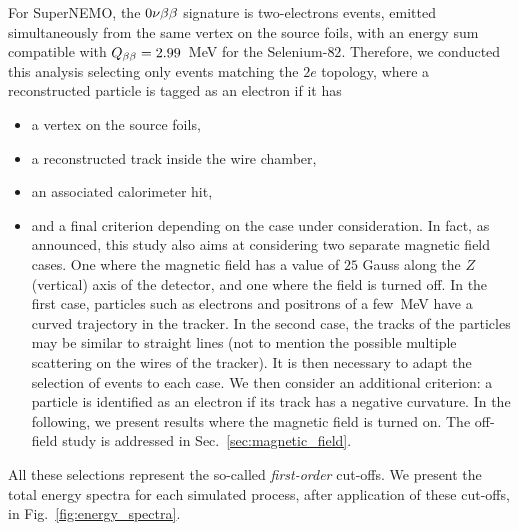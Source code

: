 For SuperNEMO, the $0\nu\beta\beta$ signature is two-electrons events, emitted simultaneously from the same vertex on the source foils, with an energy sum compatible with $Q_{\beta\beta} = 2.99$~MeV for the Selenium-$82$.
Therefore, we conducted this analysis selecting only events matching the $2e$ topology, where a reconstructed particle is tagged as an electron if it has
\begin{itemize}
\item a vertex on the source foils,
\item a reconstructed track inside the wire chamber,
\item an associated calorimeter hit,
\item and a final criterion depending on the case under consideration.
  In fact, as announced, this study also aims at considering two separate magnetic field cases.
  One where the magnetic field has a value of $25$ Gauss along the $Z$ (vertical) axis of the detector, and one where the field is turned off.
  In the first case, particles such as electrons and positrons of a few~MeV have a curved trajectory in the tracker.
  In the second case, the tracks of the particles may be similar to straight lines (not to mention the possible multiple scattering on the wires of the tracker).
  It is then necessary to adapt the selection of events to each case.
  We then consider an additional criterion: a particle is identified as an electron if its track has a negative curvature.
  In the following, we present results where the magnetic field is turned on.
  The off-field study is addressed in Sec.~\ref{sec:magnetic_field}.
\end{itemize}
All these selections represent the so-called \emph{first-order} cut-offs.
We present the total energy spectra for each simulated process, after application of these cut-offs, in Fig.~\ref{fig:energy_spectra}.
